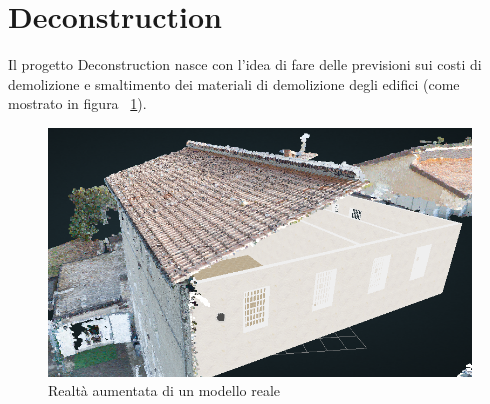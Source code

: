 \section{Deconstruction}
\label{sec:chapter_4_section_3}

Il progetto Deconstruction nasce con l'idea di fare delle previsioni
sui costi di demolizione e smaltimento dei materiali di demolizione degli edifici (come mostrato in figura ~\ref{fig:augmented}).

\begin{figure}[htbp] %
   \centering
   \includegraphics[width=1\linewidth]{images/augmented}
   \caption{Realtà aumentata di un modello reale}
   \label{fig:augmented}
\end{figure}
\newpage
